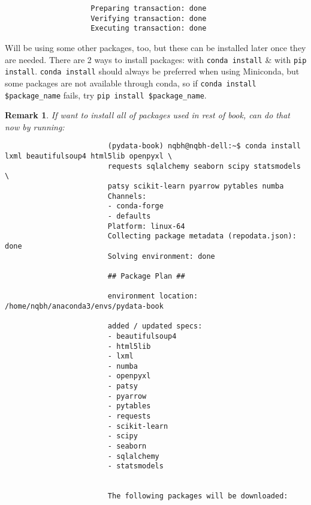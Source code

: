 \documentclass{article}
\newtheorem{remark}{Remark}
\begin{document}
\begin{enumerate}
\begin{itemize}
\begin{itemize}
\begin{itemize}
\begin{verbatim}
					Preparing transaction: done                                                     
					Verifying transaction: done                                                     
					Executing transaction: done
				\end{verbatim}
				Will be using some other packages, too, but these can be installed later once they are needed. There are 2 ways to install packages: with {\tt conda install} \& with {\tt pip install}. {\tt conda install} should always be preferred when using Miniconda, but some packages are not available through conda, so if \verb|conda install $package_name| fails, try \verb|pip install $package_name|.				
				\begin{remark}
					If want to install all of packages used in rest of book, can do that now by running:
					\begin{verbatim}
						(pydata-book) nqbh@nqbh-dell:~$ conda install lxml beautifulsoup4 html5lib openpyxl \
						requests sqlalchemy seaborn scipy statsmodels \
						patsy scikit-learn pyarrow pytables numba
						Channels:                                                                       
						- conda-forge                                                                  
						- defaults                                                                     
						Platform: linux-64                                                              
						Collecting package metadata (repodata.json): done                               
						Solving environment: done                                                       
						
						## Package Plan ##                                                              
						
						environment location: /home/nqbh/anaconda3/envs/pydata-book                   
						
						added / updated specs:                                                        
						- beautifulsoup4                                                            
						- html5lib                                                                  
						- lxml                                                                      
						- numba           
						- openpyxl
						- patsy
						- pyarrow
						- pytables
						- requests
						- scikit-learn
						- scipy
						- seaborn
						- sqlalchemy
						- statsmodels
						
						
						The following packages will be downloaded:
						

\end{verbatim}
\end{remark}
\end{itemize}
\end{itemize}
\end{itemize}
\end{enumerate}
\end{document}
